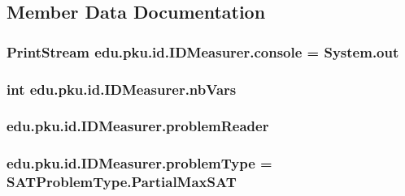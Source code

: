 \subsection{Member Data Documentation}
\hypertarget{classedu_1_1pku_1_1id_1_1_i_d_measurer_a6f306b1fa0b91200df925ca4c7d0dfb2}{
\subsubsection[{console}]{\setlength{\rightskip}{0pt plus 5cm}PrintStream {\bf edu.pku.id.IDMeasurer.console} = System.out}}
\label{classedu_1_1pku_1_1id_1_1_i_d_measurer_a6f306b1fa0b91200df925ca4c7d0dfb2}
\hypertarget{classedu_1_1pku_1_1id_1_1_i_d_measurer_ad2e7d766a3189d08bbe03f34183c1834}{
\subsubsection[{nbVars}]{\setlength{\rightskip}{0pt plus 5cm}int {\bf edu.pku.id.IDMeasurer.nbVars}}}
\label{classedu_1_1pku_1_1id_1_1_i_d_measurer_ad2e7d766a3189d08bbe03f34183c1834}
\hypertarget{classedu_1_1pku_1_1id_1_1_i_d_measurer_a1d0c7809f92ca53c0c7c1eeafde84275}{
\subsubsection[{problemReader}]{ {\bf edu.pku.id.IDMeasurer.problemReader}}}
\label{classedu_1_1pku_1_1id_1_1_i_d_measurer_a1d0c7809f92ca53c0c7c1eeafde84275}
\hypertarget{classedu_1_1pku_1_1id_1_1_i_d_measurer_a5955b5897c93bd335f41b8c45ef1365e}{
\subsubsection[{problemType}]{ {\bf edu.pku.id.IDMeasurer.problemType} = SATProblemType.PartialMaxSAT}}
